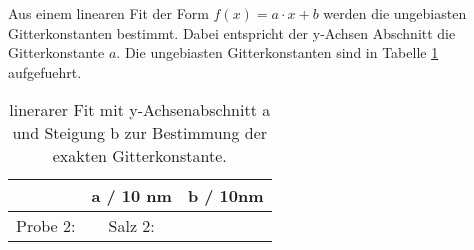 Aus einem linearen Fit der Form $f(x) = a \cdot x + b$ werden die ungebiasten
Gitterkonstanten bestimmt. 
Dabei entspricht der y-Achsen Abschnitt die Gitterkonstante $a$. 
Die ungebiasten Gitterkonstanten sind in Tabelle \ref{tab:gitt} aufgefuehrt.

\begin{table}[ht]
		\centering
		\caption{linerarer Fit mit y-Achsenabschnitt a und Steigung b zur
				Bestimmung der exakten Gitterkonstante.}
		\label{tab:gitt}
		\begin{tabular}{l c c}
				\toprule
				& a / 10 nm & b / 10nm \\
				\midrule
				Probe 2: 	& 
				Salz 2: 	& 
				\bottomrule
		\end{tabular}
\end{table}
